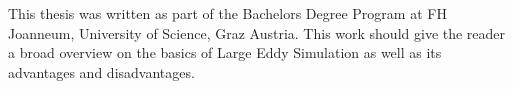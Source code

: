 This thesis was written as part of the Bachelors Degree Program at FH Joanneum, University of Science, Graz Austria.
This work should give the reader a broad overview on the basics of Large Eddy Simulation as well as its advantages and disadvantages. 
